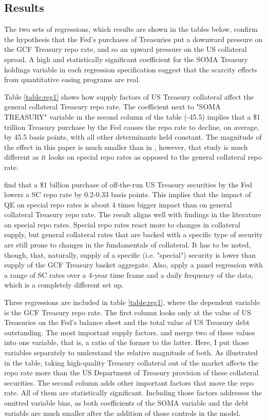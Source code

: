 \documentclass[11pt,a4paper,english,oneside]{article}
\begin{document}
\subsection{Results} \label{sec:results}

The two sets of regressions, which results are shown in the tables below, confirm the hypothesis that the Fed's purchases of Treasuries put a downward pressure on the GCF Treasury repo rate, and so an upward pressure on the US collateral spread. A high and statistically significant coefficient for the SOMA Treasury holdings variable in each regression specification suggest that the scarcity effects from quantitative easing programs are real.

Table \ref{table:reg1} shows how supply factors of US Treasury collateral affect the general collateral Treasury repo rate. The coefficient next to "SOMA TREASURY" variable in the second column of the table (-45.5) implies that a \$1 trillion Treasury purchase by the Fed causes the repo rate to decline, on average, by 45.5 basis points, with all other determinants held constant. The magnitude of the effect in this paper is much smaller than in \citet{damico2014}, however, that study is much different as it looks on special repo rates as opposed to the general collateral repo rate.

\citet{damico2014} find that a \$1 billion purchase of off-the-run US Treasury securities by the Fed lowers a SC repo rate by 0.2-0.33 basis points. This implies that the impact of QE on special repo rates is about 4 times bigger impact than on general collateral Treasury repo rate. The result aligns well with findings in the literature on special repo rates. Special repo rates react more to changes in collateral supply, but general collateral rates that are backed with a specific type of security are still prone to changes in the fundamentals of collateral. It has to be noted, though, that, naturally, supply of a specific (i.e. "special") security is lower than supply of the GCF Treasury basket aggregate. Also, \citet{damico2014} apply a panel regression with a range of SC rates over a 4-year time frame and a daily frequency of the data, which is a completely different set up.

Three regressions are included in table \ref{table:reg1}, where the dependent variable is the GCF Treasury repo rate. The first column looks only at the value of US Treasuries on the Fed's balance sheet and the total value of US Treasury debt outstanding. The most important supply factors. \citet{damico2014} and \citet{arrata2018} merge two of these values into one variable, that is, a ratio of the former to the latter. Here, I put those variables separately to understand the relative magnitude of both. As illustrated in the table, taking high-quality Treasury collateral out of the market affects the repo rate more than the US Department of Treasury provision of these collateral securities. The second column adds other important factors that move the repo rate. All of them are statistically significant. Including those factors addresses the omitted variable bias, as both coefficients of the SOMA variable and the debt variable are much smaller after the addition of those controls in the model.
\end{document}
